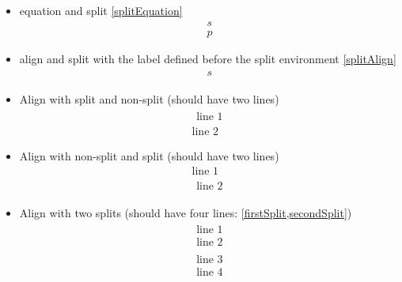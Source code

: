 \documentclass{article}
\begin{document}
\begin{itemize}
		\item equation and split \ref{splitEquation} \begin{equation} \label{splitEquation}\begin{split} s \\ p \end{split} \end{equation}
		\item align and split with the label defined before the split environment \ref{splitAlign}
			\makeatletter
			\begin{align}
				\label{splitAlign}
				\begin{split}
					s
				\end{split}
			\end{align}
			\makeatother
		\item Align with split and non-split (should have two lines)
			\begin{align}
				\begin{split}
					\text{line 1}
				\end{split}
				\\
				\text{line 2}
			\end{align}
		\item Align with non-split and split (should have two lines)
			\begin{align}
				\text{line 1}
				\\
				\begin{split}
					\text{line 2}
				\end{split}
			\end{align}
		\item Align with two splits (should have four lines: \ref{firstSplit,secondSplit})
			\begin{align}
				\begin{split}
					\text{line 1}
					\\
					\text{line 2}
				\end{split}\label{firstSplit}
				\\
				\begin{split}
					\text{line 3}
					\\
					\text{line 4}
				\end{split}\label{secondSplit}
			\end{align}

\end{itemize}
\end{document}
